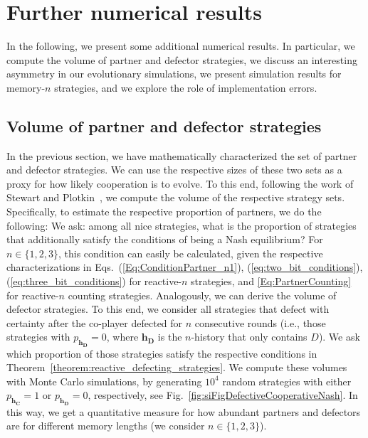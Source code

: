 \documentclass[9pt,twoside,lineno]{pnas-new}
\theoremstyle{plainCl1}
\theoremstyle{plainCl2}
\begin{document}
\clearpage
\newpage




\section{Further numerical results}\label{section:simulations}

In the following, we present some additional numerical results. 
In particular, we compute the volume of partner and defector strategies, we discuss an interesting asymmetry in our evolutionary simulations, we present simulation results for memory-$n$ strategies, and we explore the role of implementation errors. 


\subsection{Volume of partner and defector strategies}

In the previous section, we have mathematically characterized the set of partner and defector strategies. 
We can use the respective sizes of these two sets as a proxy for how likely cooperation is to evolve. 
To this end, following the work of Stewart and Plotkin~\cite{stewart:scientific:2016}, we compute the volume of the respective strategy sets. 
Specifically, to estimate the respective proportion of partners, we do the following: 
We ask: among all nice strategies, what is the proportion of strategies that additionally satisfy the conditions of being a Nash equilibrium? 
For $n\!\in\!\{1,2,3\}$, this condition can easily be calculated, given the respective characterizations in Eqs.~(\ref{Eq:ConditionPartner_n1}), (\ref{eq:two_bit_conditions}), (\ref{eq:three_bit_conditions}) for reactive-$n$ strategies, and \eqref{Eq:PartnerCounting} for reactive-$n$ counting strategies. 
Analogously, we can derive the volume of defector strategies. 
To this end, we consider all strategies that defect with certainty after the co-player defected for $n$ consecutive rounds (i.e., those strategies with $p_\mathbf{h_D}\!=\!0$, where $\mathbf{h_D}$ is the $n$-history that only contains $D$). 
We ask which proportion of those strategies satisfy the respective conditions in Theorem~\ref{theorem:reactive_defecting_strategies}. 
We compute these volumes with Monte Carlo simulations, by generating $10^4$ random strategies with either $p_\mathbf{h_C}\!=\!1$ or $p_\mathbf{h_D}\!=\!0$, respectively, see Fig.~\ref{fig:siFigDefectiveCooperativeNash}. 
In this way, we get a quantitative measure for how abundant partners and defectors are for different memory lengths (we consider $n\!\in\!\{1,2,3\}$).
\end{document}
